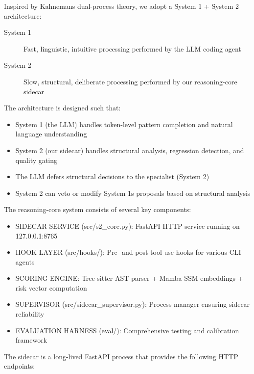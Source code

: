 

Inspired by Kahnemans dual-process theory, we adopt a System 1 + System 2 architecture:

\begin{description}
    \item[System 1] Fast, linguistic, intuitive processing performed by the LLM coding agent
    \item[System 2] Slow, structural, deliberate processing performed by our reasoning-core sidecar
\end{description}

The architecture is designed such that:

\begin{itemize}
    \item System 1 (the LLM) handles token-level pattern completion and natural language understanding
    \item System 2 (our sidecar) handles structural analysis, regression detection, and quality gating
    \item The LLM defers structural decisions to the specialist (System 2)
    \item System 2 can veto or modify System 1s proposals based on structural analysis
\end{itemize}


The reasoning-core system consists of several key components:

\begin{itemize}
    \item SIDECAR SERVICE (src/s2_core.py): FastAPI HTTP service running on 127.0.0.1:8765
    \item HOOK LAYER (src/hooks/): Pre- and post-tool use hooks for various CLI agents
    \item SCORING ENGINE: Tree-sitter AST parser + Mamba SSM embeddings + risk vector computation
    \item SUPERVISOR (src/sidecar_supervisor.py): Process manager ensuring sidecar reliability
    \item EVALUATION HARNESS (eval/): Comprehensive testing and calibration framework
\end{itemize}


The sidecar is a long-lived FastAPI process that provides the following HTTP endpoints:

